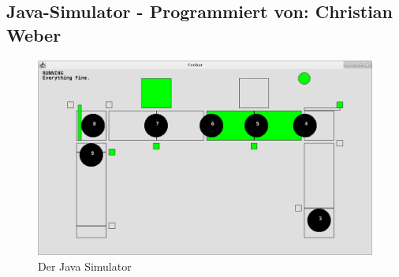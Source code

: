 \documentclass[fontsize=11pt,a4paper,final]{scrartcl}[2003/01/01]
\makeatletter
\def\ScaleIfNeeded{%
	\ifdim\Gin@nat@width>\linewidth
		\linewidth
	\else
		\Gin@nat@width
	\fi
}
\newcommand*{\chris}{%
	Programmiert von: Christian Weber
}
\makeatother
\begin{document}
\subsection{Java-Simulator - \chris}

\begin{figure}[H]
	\centering
	\includegraphics[width=1\ScaleIfNeeded]{Bilder/Java-Simulator.png}
	\caption{Der Java Simulator}
	\label{fig:Java-Simulator}
\end{figure}
\end{document}
